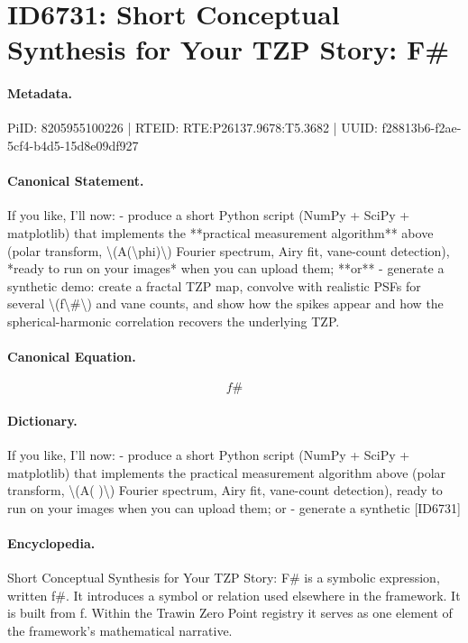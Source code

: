 \section*{ID6731: Short Conceptual Synthesis for Your TZP Story: F\#}
\paragraph{Metadata.}
PiID: 8205955100226 | RTEID: RTE:P26137.9678:T5.3682 | UUID: f28813b6-f2ae-5cf4-b4d5-15d8e09df927

\paragraph{Canonical Statement.}
If you like, I’ll now: - produce a short Python script (NumPy + SciPy + matplotlib) that implements the **practical measurement algorithm** above (polar transform, \textbackslash{}(A(\textbackslash{}phi)\textbackslash{}) Fourier spectrum, Airy fit, vane-count detection), *ready to run on your images* when you can upload them; **or** - generate a synthetic demo: create a fractal TZP map, convolve with realistic PSFs for several \textbackslash{}(f\textbackslash{}\#\textbackslash{}) and vane counts, and show how the spikes appear and how the spherical-harmonic correlation recovers the underlying TZP.

\paragraph{Canonical Equation.}
\[
f\#
\]

\paragraph{Dictionary.}
If you like, I’ll now: - produce a short Python script (NumPy + SciPy + matplotlib) that implements the practical measurement algorithm above (polar transform, \textbackslash{}(A( )\textbackslash{}) Fourier spectrum, Airy fit, vane-count detection), ready to run on your images when you can upload them; or - generate a synthetic [ID6731]

\paragraph{Encyclopedia.}
Short Conceptual Synthesis for Your TZP Story: F\# is a symbolic expression, written f\#. It introduces a symbol or relation used elsewhere in the framework. It is built from f. Within the Trawin Zero Point registry it serves as one element of the framework's mathematical narrative.
